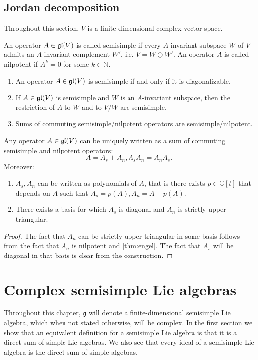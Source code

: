 \documentclass{report}
\begin{document}
\section{Jordan decomposition}
Throughout this section, $V$ is a finite-dimensional complex vector space.
\begin{definition}
    An operator $A \in \operatorname{{\mathfrak{gl}}}(V)$ is called semisimple if every $A$-invariant subspace $W$ of $V$ admits an $A$-invariant complement $W'$, i.e. $V = W \oplus W'$.
    An operator $A$ is called nilpotent if $A^k = 0$ for some $k \in \mathbb N$.
\end{definition}

\begin{lemma}
    \begin{enumerate}[label = (\roman*)]
        \item An operator $A \in \operatorname{{\mathfrak{gl}}}(V)$ is semisimple if and only if it is diagonalizable.
        \item If $A \in \operatorname{{\mathfrak{gl}}}(V)$ is semisimple and $W$ is an $A$-invariant subspace, then the restriction of $A$ to $W$ and to $V/W$ are semisimple.
        \item Sums of commuting semisimple/nilpotent operators are semisimple/nilpotent.
    \end{enumerate}
\end{lemma}

\begin{theorem}
    Any operator $A \in \operatorname{{\mathfrak{gl}}}(V)$ can be uniquely written as a sum of commuting semisimple and nilpotent operators:
    \[
    A = A_s + A_n, A_s A_n = A_n A_s.
    \]
    Moreover:
    \begin{enumerate}[label = (\roman*)]
        \item $A_s, A_n$ can be written as polynomials of $A$, that is there exists $p \in \mathbb C[t]$ that depends on $A$ such that $A_s = p(A), A_n = A - p(A)$.
        \item There exists a basis for which $A_s$ is diagonal and $A_n$ is strictly upper-triangular.
    \end{enumerate}
\end{theorem}
\begin{proof}
    The fact that $A_n$ can be strictly upper-triangular in some basis follows from the fact that $A_n$ is nilpotent and \cref{thm:engel}.
    The fact that $A_s$ will be diagonal in that basis is clear from the construction.
\end{proof}

\chapter{Complex semisimple Lie algebras}
Throughout this chapter, $\mathfrak g$ will denote a finite-dimensional semisimple Lie algebra, which when not stated otherwise, will be complex.
In the first section we show that an equivalent definition for a semisimple Lie algebra is that it is a direct sum of simple Lie algebras.
We also see that every ideal of a semisimple Lie algebra is the direct sum of simple algebras.
\end{document}
